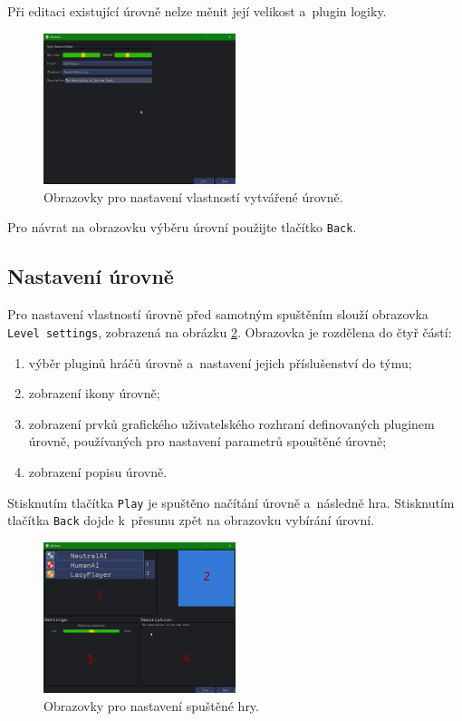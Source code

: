Při editaci existující úrovně nelze měnit její velikost a~plugin logiky.

\begin{figure}[h]
	\centering
	\includegraphics[width=0.5\textwidth]{img/LevelCreationScreen.png}
	\caption{Obrazovky pro nastavení vlastností vytvářené úrovně.}
	\label{fig:levelcreation}
\end{figure}

Pro návrat na obrazovku výběru úrovní použijte tlačítko \texttt{Back}.

\subsection{Nastavení úrovně}
Pro nastavení vlastností úrovně před samotným spuštěním slouží obrazovka \texttt{Level settings}, zobrazená na obrázku \ref{fig:levelsettings}. Obrazovka je rozdělena do čtyř částí:

\begin{enumerate}
	\item výběr pluginů hráčů úrovně a~nastavení jejich příslušenství do týmu;
	\item zobrazení ikony úrovně;
	\item zobrazení prvků grafického uživatelského rozhraní definovaných pluginem úrovně, používaných pro nastavení parametrů spouštěné úrovně;
	\item zobrazení popisu úrovně.
\end{enumerate}

Stisknutím tlačítka \texttt{Play} je spuštěno načítání úrovně a~následně hra. Stisknutím tlačítka \texttt{Back} dojde k~přesunu zpět na obrazovku vybírání úrovní.

\begin{figure}[h]
	\centering
	\includegraphics[width=0.5\textwidth]{img/LevelSettingsScreen.png}
	\caption{Obrazovky pro nastavení spuštěné hry.}
	\label{fig:levelsettings}
\end{figure}

